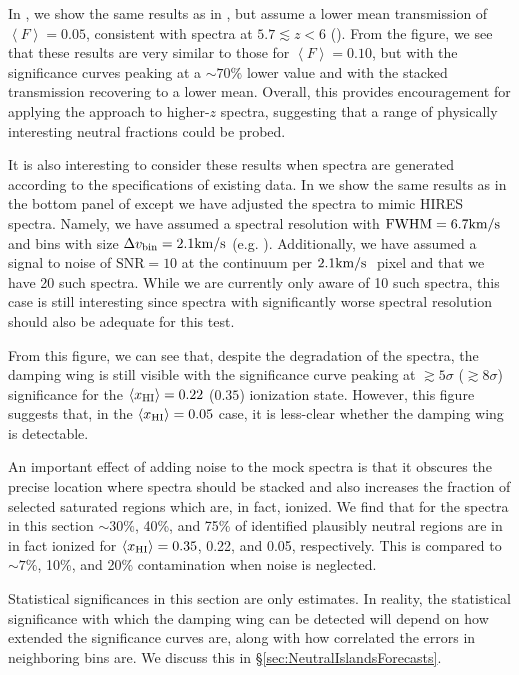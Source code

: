 In , we show the same results as in , but assume a lower mean transmission of $\left\langle F \right\rangle = 0.05$, consistent with spectra at $5.7 \lesssim z < 6$ (\citealt{Becker:2001ee}). From the figure, we see that these results are very similar to those for $\left\langle F \right\rangle = 0.10$, but with the significance curves peaking at a $\sim 70\%$ lower value and with the stacked transmission recovering to a lower mean. Overall, this provides encouragement for applying the approach to higher-$z$ spectra, suggesting that a range of physically interesting neutral fractions could be probed.


It is also interesting to consider these results when spectra are generated according to the specifications of existing data. In  we show the same results as in the bottom panel of  except we have adjusted the spectra to mimic HIRES spectra. Namely, we have assumed a spectral resolution with $\text{FWHM} = 6.7\kms\ $ and bins with size $\Delta v_{\text{bin}} = 2.1\text{km}/\text{s}$ (e.g. \citealt{Viel:2013fqw}). Additionally, we have assumed a signal to noise of $\text{SNR} = 10$ at the continuum per $2.1\text{km}/\text{s}\ $ pixel and that we have 20 such spectra. While we are currently only aware of 10 such spectra, this case is still interesting since spectra with significantly worse spectral resolution should also be adequate for this test. 


From this figure, we can see that, despite the degradation of the spectra, the damping wing is still visible with the significance curve peaking at $\gtrsim 5\sigma$ ($\gtrsim 8\sigma$) significance for the $\langle x_{\text{HI}}\rangle = 0.22$ ($0.35$) ionization state. However, this figure suggests that, in the $\langle x_{\text{HI}}\rangle = 0.05$ case, it is less-clear whether the damping wing is detectable. 



An important effect of adding noise to the mock spectra is that it obscures the precise location where spectra should be stacked and also increases the fraction of selected saturated regions which are, in fact, ionized. We find that for the spectra in this section $\sim 30\%$, 40\%, and 75\% of identified plausibly neutral regions are in in fact ionized for $\langle x_{\text{HI}}\rangle = 0.35$, 0.22, and 0.05, respectively. This is compared to $\sim 7\%$, 10\%, and 20\% contamination when noise is neglected.


Statistical significances in this section are only estimates. In reality, the statistical significance with which the damping wing can be detected will depend on how extended the significance curves are, along with how correlated the errors in neighboring bins are. We discuss this in \S\ref{sec:NeutralIslandsForecasts}.


